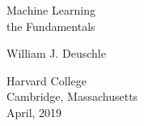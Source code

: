\documentclass[11pt,twoside,letterpaper,openany]{book}
\begin{document}
\frontmatter

	\begin{titlepage}
	\raggedright\thispagestyle{empty}
	{\Huge Machine Learning \\ \Large the Fundamentals}

	{\Large William J. Deuschle}

	{\Large Harvard College \\ Cambridge, Massachusetts \\ April, 2019\\}
	\end{titlepage}

	\begin{onehalfspacing}
	\tableofcontents
	\end{onehalfspacing}

\mainmatter
\end{document}
